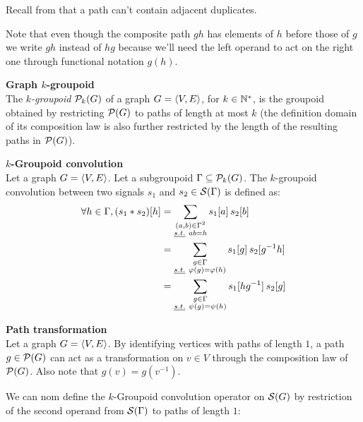 \begin{remark}Recall from  that a path can't contain adjacent duplicates.
\end{remark}

\begin{remark}Note that even though the composite path $gh$ has elements of $h$ before those of $g$ we write $gh$ instead of $hg$ because we'll need the left operand to act on the right one through functional notation $g(h)$.
\end{remark}

\begin{definition}\textbf{Graph $k$-groupoid}\\
The \emph{$k$-groupoid} $\cp_k(G)$ of a graph $\gve$, for $k \in \bbn^*$, is the groupoid obtained by restricting $\cp(G)$ to paths of length at most $k$ (the definition domain of its composition law is also further restricted by the length of the resulting paths in $\cp(G)$).
\end{definition}

\begin{definition}\textbf{$k$-Groupoid convolution}\\
Let a graph $\gve$. Let a subgroupoid $\Gamma \subseteq \cp_k(G)$. The $k$-groupoid convolution between two signals $s_1$ and $s_2 \in \cs(\Gamma)$ is defined as:
\begin{align*}
\forall h \in \Gamma, (s_1 \ast s_2) [h] & = \displaystyle \sum_{\substack{(a,b) \in \Gamma^2 \\ \st ab=h }} s_1[a] \h{2} s_2[b] \\
& = \displaystyle \sum_{\substack{g \in \Gamma\\ \st \varphi(g) = \varphi(h)}} s_1[g] \h{2} s_2[g^{-1}h]\\
& = \displaystyle \sum_{\substack{g \in \Gamma\\ \st \psi(g) = \psi(h)}} s_1[hg^{-1}] \h{2} s_2[g]
\end{align*}
\label{def:pconv}
\end{definition}

\begin{claim}\textbf{Path transformation}\\
Let a graph $\gve$. By identifying vertices with paths of length $1$, a path $g \in \cp(G)$ can act as a transformation on $v \in V$ through the composition law of $\cp(G)$. Also note that $g(v) = g(v^{-1})$.
\end{claim}

We can nom define the $k$-Groupoid convolution operator on $\cs(G)$ by restriction of the second operand from $\cs(\Gamma)$ to paths of length $1$:


